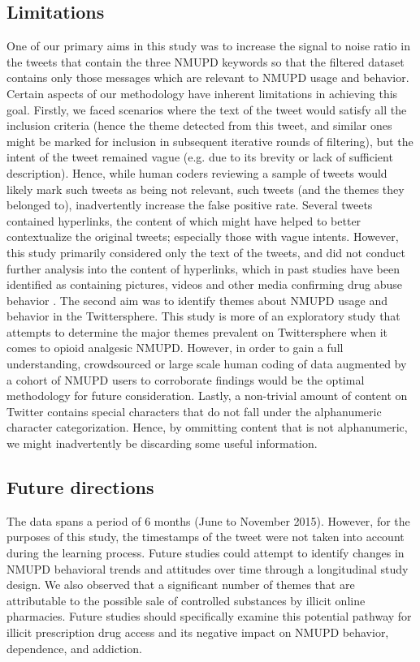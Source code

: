 \subsection{Limitations}
%
One of our primary aims in this study was to increase the 
signal to noise ratio in the tweets that contain the three 
NMUPD keywords so that the filtered dataset contains only 
those messages which are relevant to NMUPD usage and behavior. 
Certain aspects of our methodology have inherent limitations in 
achieving this goal. Firstly, we faced scenarios where the text of the 
tweet would satisfy all the inclusion criteria (hence the theme 
detected from this tweet, and similar ones might be marked for 
inclusion in subsequent iterative rounds of filtering), but 
the intent of the tweet remained vague (e.g. due to its 
brevity or lack of sufficient description). Hence, while human 
coders reviewing a sample of tweets would likely mark such tweets 
as being not relevant, such tweets (and the themes they 
belonged to), inadvertently increase the false positive rate. 
Several tweets contained hyperlinks, the content of which might 
have helped to better contextualize the original tweets; 
especially those with vague intents. However, this study primarily 
considered only the text of the tweets, and did not conduct 
further analysis into the content of hyperlinks, which in past 
studies have been identified as containing pictures, videos 
and other media confirming drug abuse behavior \cite{katsuki2015establishing}. 
The second aim was to identify themes about NMUPD usage and behavior 
in the Twittersphere. This study is more of an exploratory study that 
attempts to determine the major themes prevalent on Twittersphere when 
it comes to opioid analgesic NMUPD. However, in order to gain a full 
understanding, crowdsourced or large scale human coding of data 
augmented by a cohort of NMUPD users to corroborate findings would 
be the optimal methodology for future consideration. Lastly, a non-trivial 
amount of content on Twitter contains special characters that do not 
fall under the alphanumeric character categorization. Hence, by 
ommitting content that is not alphanumeric, we might inadvertently 
be discarding some useful information.
%
\subsection{Future directions}
%
The data spans a period of 6 months (June to November 2015). 
However, for the purposes of this study, the timestamps of the tweet were not taken into account during the learning process.
%
Future studies could attempt to identify changes in 
NMUPD behavioral trends and attitudes over time through a longitudinal 
study design. We also observed that a significant number of 
themes that are attributable to the possible sale of controlled 
substances by illicit online pharmacies. Future studies should 
specifically examine this potential pathway for illicit prescription 
drug access and its negative impact on NMUPD behavior, dependence, and addiction.
